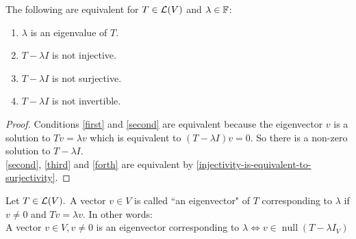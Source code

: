 \setcounter{thm}{6}
\begin{thm}
  \label{equivalent-conditions-to-be-an-eigenvalue}
  The following are equivalent for $T \in \mathcal{L}(V)$ and $\lambda \in \mathbb{F}$:
  \begin{enumerate}[label=(\alph*)]
    \item $\lambda$ is an eigenvalue of $T$. \label{first}
    \item $T-\lambda I$ is not injective. \label{second}
    \item $T-\lambda I$ is not surjective. \label{third}
    \item $T-\lambda I$ is not invertible. \label{forth}
  \end{enumerate}
\end{thm}
\begin{proof}
  Conditions \ref{first} and \ref{second} are equivalent because the eigenvector $v$ is a solution to $Tv=\lambda v$ which is equivalent to $(T-\lambda I)v=0$. So there is a non-zero solution to $T-\lambda I$. \\
  \ref{second}, \ref{third} and \ref{forth} are equivalent by \ref{injectivity-is-equivalent-to-surjectivity}.

\end{proof}

\setcounter{thm}{7}
\begin{mydef}
  Let $T\in \mathcal{L}(V).$ A vector $v \in V$ is called ``an eigenvector" of $T$ corresponding to $\lambda$ if $v\neq 0$ and $Tv = \lambda v$.
  In other words:
  \\A vector $v\in V, v \neq 0$ is an eigenvector corresponding to $\lambda \iff v \in \operatorname{null}(T-\lambda I_V)$
\end{mydef}

